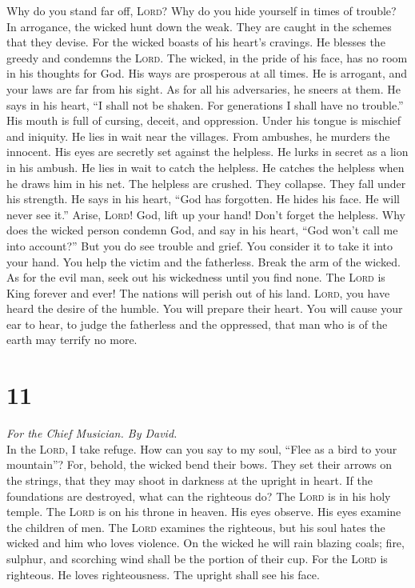  Why do you stand far off, \textsc{Lord}? Why do you hide
yourself in times of trouble?  In arrogance, the wicked
hunt down the weak. They are caught in the schemes that they devise.
 For the wicked boasts of his heart's cravings. He blesses
the greedy and condemns the \textsc{Lord}.  The wicked, in
the pride of his face, has no room in his thoughts for God.
 His ways are prosperous at all times. He is arrogant, and
your laws are far from his sight. As for all his adversaries, he sneers
at them.  He says in his heart, ``I shall not be shaken.
For generations I shall have no trouble.''  His mouth is
full of cursing, deceit, and oppression. Under his tongue is mischief
and iniquity.  He lies in wait near the villages. From
ambushes, he murders the innocent. His eyes are secretly set against the
helpless.  He lurks in secret as a lion in his ambush. He
lies in wait to catch the helpless. He catches the helpless when he
draws him in his net.  The helpless are crushed. They
collapse. They fall under his strength.  He says in his
heart, ``God has forgotten. He hides his face. He will never see it.''
 Arise, \textsc{Lord}! God, lift up your hand! Don't
forget the helpless.  Why does the wicked person condemn
God, and say in his heart, ``God won't call me into account?''
 But you do see trouble and grief. You consider it to
take it into your hand. You help the victim and the fatherless.
 Break the arm of the wicked. As for the evil man, seek
out his wickedness until you find none.  The
\textsc{Lord} is King forever and ever! The nations will perish out of
his land.  \textsc{Lord}, you have heard the desire of
the humble. You will prepare their heart. You will cause your ear to
hear,  to judge the fatherless and the oppressed, that
man who is of the earth may terrify no more.

\hypertarget{section-10}{%
\section{11}\label{section-10}}

\emph{For the Chief Musician. By David.}\\
 In the \textsc{Lord}, I take refuge. How can you say to
my soul, ``Flee as a bird to your mountain''?  For,
behold, the wicked bend their bows. They set their arrows on the
strings, that they may shoot in darkness at the upright in heart.
 If the foundations are destroyed, what can the righteous
do?  The \textsc{Lord} is in his holy temple. The
\textsc{Lord} is on his throne in heaven. His eyes observe. His eyes
examine the children of men.  The \textsc{Lord} examines
the righteous, but his soul hates the wicked and him who loves violence.
 On the wicked he will rain blazing coals; fire, sulphur,
and scorching wind shall be the portion of their cup.  For
the \textsc{Lord} is righteous. He loves righteousness. The upright
shall see his face.

